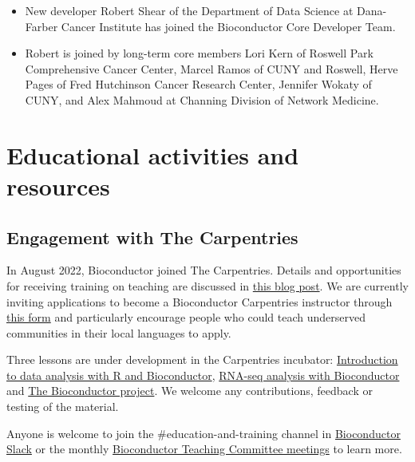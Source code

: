 \begin{itemize}
\tightlist
\item
  New developer Robert Shear of the
  Department of Data Science at Dana-Farber Cancer
  Institute has joined the Bioconductor Core Developer Team.
\item
  Robert is joined by long-term core members Lori Kern of Roswell Park
  Comprehensive Cancer Center, Marcel Ramos of CUNY and Roswell, Herv\textquotesingle e Pages of
  Fred Hutchinson Cancer Research Center, Jennifer Wokaty of CUNY, and Alex
  Mahmoud at Channing Division of Network Medicine.
\end{itemize}

\hypertarget{educational-activities-and-resources}{%
\section{Educational activities and resources}\label{educational-activities-and-resources}}

\hypertarget{engagement-with-the-carpentries}{%
\subsection{Engagement with The Carpentries}\label{engagement-with-the-carpentries}}

In August 2022, Bioconductor joined The Carpentries. Details and opportunities
for receiving training on teaching are discussed in \href{https://bioconductor.github.io/biocblog/posts/2022-07-12-carpentries-membership/}{this blog post}.
We are currently inviting applications to become a Bioconductor Carpentries instructor through \href{https://docs.google.com/forms/d/1PxqbPrKJymnHwofOz_03ygM9-zwSLXX-DcraepTHxXQ}{this form} and particularly encourage people who could teach underserved communities in their local languages to apply.

Three lessons are under development in the Carpentries incubator: \href{https://carpentries-incubator.github.io/bioc-intro/}{Introduction to data analysis with R and Bioconductor}, \href{https://carpentries-incubator.github.io/bioc-rnaseq/}{RNA-seq analysis with Bioconductor} and \href{https://carpentries-incubator.github.io/bioc-project/}{The Bioconductor project}. We welcome any contributions, feedback or testing of the material.

Anyone is welcome to join the \#education-and-training channel in \href{https://slack.bioconductor.org}{Bioconductor Slack} or the monthly \href{https://www.bioconductor.org/help/education-training/}{Bioconductor Teaching Committee meetings} to learn more.

